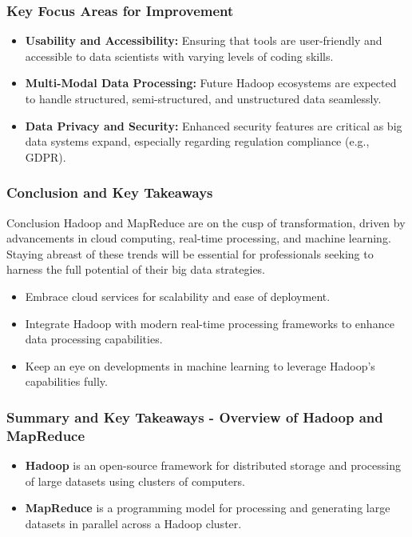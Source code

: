 \documentclass[aspectratio=169]{beamer}
\begin{document}
\begin{frame}[fragile]
    \frametitle{Key Focus Areas for Improvement}
    \begin{itemize}
        \item \textbf{Usability and Accessibility:} Ensuring that tools are user-friendly and accessible to data scientists with varying levels of coding skills.
        \item \textbf{Multi-Modal Data Processing:} Future Hadoop ecosystems are expected to handle structured, semi-structured, and unstructured data seamlessly.
        \item \textbf{Data Privacy and Security:} Enhanced security features are critical as big data systems expand, especially regarding regulation compliance (e.g., GDPR).
    \end{itemize}
\end{frame}

\begin{frame}[fragile]
    \frametitle{Conclusion and Key Takeaways}
    \begin{block}{Conclusion}
        Hadoop and MapReduce are on the cusp of transformation, driven by advancements in cloud computing, real-time processing, and machine learning. Staying abreast of these trends will be essential for professionals seeking to harness the full potential of their big data strategies.
    \end{block}
    \begin{itemize}
        \item Embrace cloud services for scalability and ease of deployment.
        \item Integrate Hadoop with modern real-time processing frameworks to enhance data processing capabilities.
        \item Keep an eye on developments in machine learning to leverage Hadoop’s capabilities fully.
    \end{itemize}
\end{frame}

\begin{frame}[fragile]
    \frametitle{Summary and Key Takeaways - Overview of Hadoop and MapReduce}
    \begin{itemize}
        \item \textbf{Hadoop} is an open-source framework for distributed storage and processing of large datasets using clusters of computers.
        \item \textbf{MapReduce} is a programming model for processing and generating large datasets in parallel across a Hadoop cluster.
    \end{itemize}
\end{frame}
\end{document}
